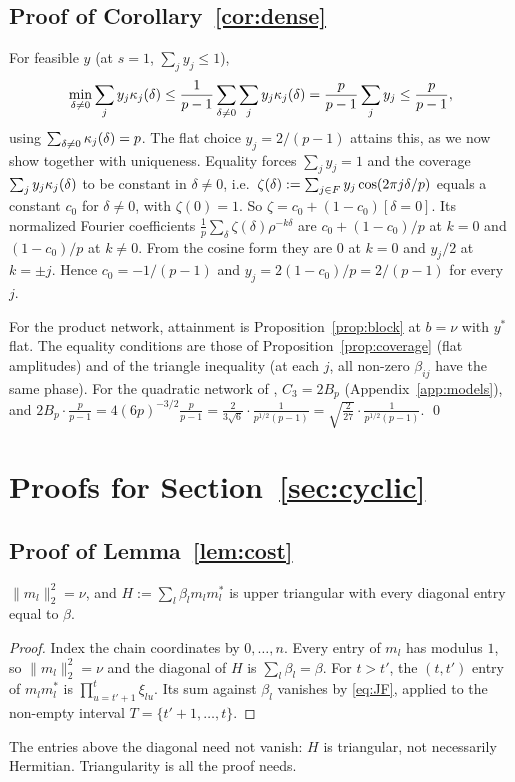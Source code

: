 \subsection{Proof of Corollary~\ref{cor:dense}}\label{app:dense}

For feasible $y$ (at $s=1$, $\sum_jy_j\le1$),
\[
\min_{\delta\neq0}\sum_jy_j\kappa_{j}(\delta)\le\frac1{p-1}\sum_{\delta\neq0}\sum_jy_j\kappa_{j}(\delta)=\frac p{p-1}\sum_jy_j\le\frac p{p-1},
\]
using $\sum_{\delta\neq0}\kappa_{j}(\delta)=p$. The flat choice $y_j=2/(p-1)$ attains this, as we now show together with uniqueness. Equality forces $\sum_jy_j=1$ and the coverage $\sum_jy_j\kappa_{j}(\delta)$ to be constant in $\delta\neq0$, i.e.\ $\zeta(\delta):=\sum_{j\in F}y_j\cos(2\pi j\delta/p)$ equals a constant $c_0$ for $\delta\neq0$, with $\zeta(0)=1$. So $\zeta=c_0+(1-c_0)[\delta=0]$. Its normalized Fourier coefficients $\frac1p\sum_\delta\zeta(\delta)\rho^{-k\delta}$ are $c_0+(1-c_0)/p$ at $k=0$ and $(1-c_0)/p$ at $k\neq0$. From the cosine form they are $0$ at $k=0$ and $y_j/2$ at $k=\pm j$. Hence $c_0=-1/(p-1)$ and $y_j=2(1-c_0)/p=2/(p-1)$ for every $j$.

For the product network, attainment is Proposition~\ref{prop:block} at $b=\nu$ with $y^*$ flat. The equality conditions are those of Proposition~\ref{prop:coverage} (flat amplitudes) and of the triangle inequality (at each $j$, all non-zero $\beta_{ij}$ have the same phase). For the quadratic network of \citet{morwani2024feature}, $C_3=2B_p$ (Appendix~\ref{app:models}), and $2B_p\cdot\frac p{p-1}=4(6p)^{-3/2}\frac p{p-1}=\frac{2}{3\sqrt6}\cdot\frac1{p^{1/2}(p-1)}=\sqrt{\frac2{27}}\cdot\frac1{p^{1/2}(p-1)}$.
\qed

\section{Proofs for Section~\ref{sec:cyclic}}\label{app:cyclic}

\subsection{Proof of Lemma~\ref{lem:cost}}\label{app:cost}

\begin{lemma}\label{lem:chain}
$\|m_l\|_2^2=\nu$, and $H:=\sum_l\beta_lm_lm_l^*$ is upper triangular with every diagonal entry equal to $\beta$.
\end{lemma}
\begin{proof}
Index the chain coordinates by $0,\dots,n$. Every entry of $m_l$ has modulus $1$, so $\|m_l\|_2^2=\nu$ and the diagonal of $H$ is $\sum_l\beta_l=\beta$. For $t>t'$, the $(t,t')$ entry of $m_lm_l^*$ is $\prod_{u=t'+1}^{t}\xi_{lu}$. Its sum against $\beta_l$ vanishes by \eqref{eq:JF}, applied to the non-empty interval $T=\{t'+1,\dots,t\}$.
\end{proof}
The entries above the diagonal need not vanish: $H$ is triangular, not necessarily Hermitian. Triangularity is all the proof needs.

